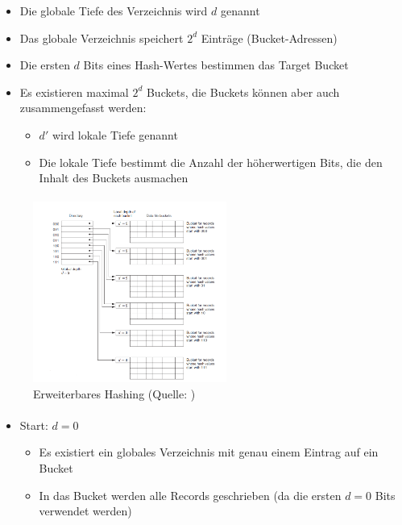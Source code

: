 {\begin{frame}{\insertsection}
\begin{itemize}
		\item Die globale Tiefe des Verzeichnis wird $d$ genannt 
		\item Das globale Verzeichnis speichert $2^d$ Einträge (Bucket-Adressen) 
		\item Die ersten $d$ Bits eines Hash-Wertes bestimmen das Target Bucket 
		\item Es existieren maximal $2^d$ Buckets, die Buckets können aber auch zusammengefasst werden: 
		\begin{itemize}
			\item $d'$ wird lokale Tiefe genannt 
			\item Die lokale Tiefe bestimmt die Anzahl der höherwertigen Bits, die den Inhalt des Buckets ausmachen
		\end{itemize}
	\end{itemize}		
\end{frame}
%
\begin{frame}{\insertsection}
	\framesubtitle{\insertsubsection}
	\begin{center}
		\begin{figure}
				\includegraphics[width=180pt]{img/extHash.png}
			\caption{Erweiterbares Hashing (Quelle: \cite[S. 613]{EN10})}
		\end{figure}
	\end{center}
\end{frame}
%
\begin{frame}{\insertsection}
	\framesubtitle{\insertsubsection}
	\begin{itemize}
		\item Start: $d=0$
		\begin{itemize}
			\item Es existiert ein globales Verzeichnis mit genau einem Eintrag auf ein Bucket
			\item In das Bucket werden alle Records geschrieben (da die ersten $d=0$ Bits verwendet werden)
		\end{itemize}

\end{itemize}
\end{frame}}
